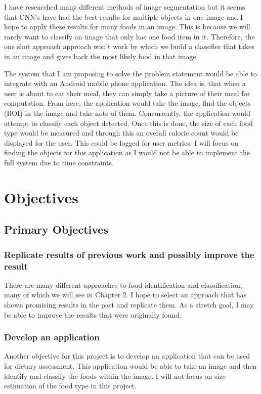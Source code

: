 I have researched many different methods of image segmentation but it seems that CNN's have had the best results for multiple objects in one image and I hope to apply these results for many foods in an image.
This is because we will rarely want to classify an image that only has one food
item in it. Therefore, the one shot approach approach won't work by which we
build a classifier that takes in an image and gives back the most likely food in
that image.

The system that I am proposing to solve the problem statement would be able to
integrate with an Android mobile phone application.
The idea is, that when a user is about to eat their meal, they can simply take a picture of their meal for computation.
From here, the application would take the image, find the objects (ROI) in the image and take note of them.
Concurrently, the application would attempt to classify each object detected.
Once this is done, the size of each food type would be measured and through this an overall calorie count would be displayed for the user.
This could be logged for user metrics. 
I will focus on finding the objects for this application as I would not be able to implement the full system due to time constraints.

\section{Objectives}
\subsection{Primary Objectives}
\subsubsection{Replicate results of previous work and possibly improve the
result}
There are many different approaches to food identification and classification,
many of which we will see in Chapter 2. I hope to select an approach that has
shown promising results in the past and replicate them. As a stretch goal, I may
be able to improve the results that were originally found.

\subsubsection{Develop an application}
Another objective for this project is to develop an application that can be used
for dietary assessment. This application would be able to take an image and then
identify and classify the foods within the image. I will not focus on size
estimation of the food type in this project.

